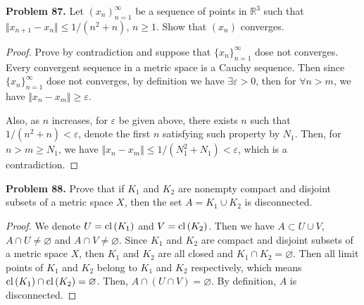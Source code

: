 \documentclass[12pt,leqno]{amsart}
\theoremstyle{definition}
\numberwithin{equation}{subsection}
\begin{document}
\medskip


\noindent
{\bf Problem 87.}
Let $(x_n)_{n=1}^\infty$ be a sequence of points in $\mathbb{R}^3$ such that $\Vert x_{n+1}-x_n\Vert\leq 1/(n^2+n)$, $n\geq 1$. Show that $(x_n)$ converges.
\begin{proof}
Prove by contradiction and suppose that $\{x_n\}_{n=1}^\infty$ dose not converges. Every convergent sequence in a metric space is a Cauchy sequence. Then since $\{x_n\}_{n=1}^\infty$ dose not converges, by definition we have $\exists \varepsilon > 0$, then for $\forall n > m$, we have $\Vert x_n - x_m\Vert\geq\varepsilon$. 

Also, as $n$ increases, for $\varepsilon$ be given above, there exists $n$ such that $1/(n^2 + n) < \varepsilon$, denote the first $n$ satisfying such property by $N_1$. Then, for $n > m \geq N_1$, we have  $\Vert x_n - x_m\Vert\leq 1/(N_1^2+N_1) < \varepsilon$, which is a contradiction.
\end{proof}

\medskip

\noindent
{\bf Problem 88.}
Prove that if $K_1$ and $K_2$ are nonempty compact and disjoint subsets of
a metric space $X$, then the set $A=K_1\cup K_2$ is disconnected.
\begin{proof}
We denote $U = {\rm cl}\,(K_1)$ and $V = {\rm cl}\,(K_2)$. Then we have $A \subset U\cup V$, $A\cap U \neq \varnothing$ and $A\cap V\neq \varnothing$. Since $K_1$ and $K_2$ are compact and disjoint subsets of a metric space $X$, then $K_1$ and $K_2$ are all closed and $K_1\cap K_2 = \varnothing$. Then all limit points of $K_1$ and $K_2$ belong to $K_1$ and $K_2$ respectively, which means ${\rm cl}\,(K_1)\cap {\rm cl}\,(K_2) = \varnothing$. Then, $A \cap (U\cap V) = \varnothing$. By definition, $A$ is disconnected.
\end{proof}

\medskip
\end{document}
